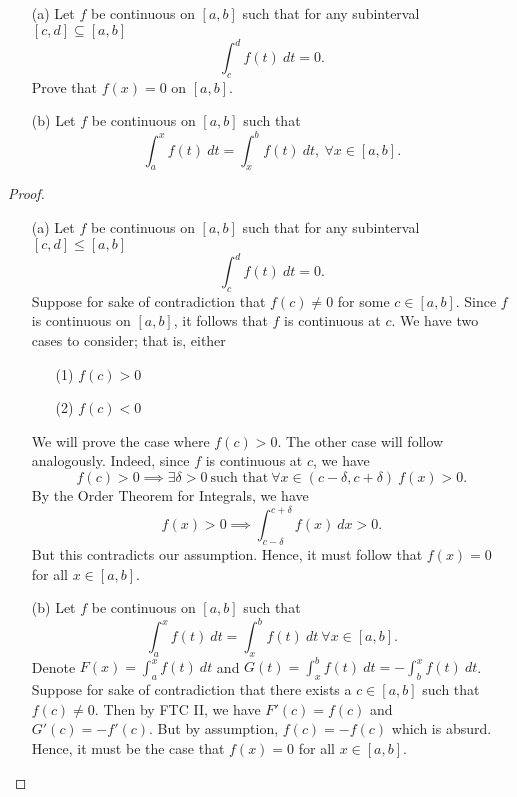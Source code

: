 \documentclass[a4paper]{article}
\begin{document}
\begin{problem}
   \begin{enumerate}
       \item[(a)] Let \( f  \) be continuous on \( [a,b] \) such that for any subinterval \( [c,d] \subseteq  [a,b] \)
           \[  \int_{ c }^{ d } f(t) \ dt = 0.  \]
           Prove that \( f(x) = 0  \) on \( [a,b] \).
       \item[(b)] Let \( f  \) be continuous on \( [a,b] \) such that 
           \[  \int_{ a }^{ x  } f(t) \ dt = \int_{ x }^{ b }  f(t) \ dt, \ \forall x \in [a,b]. \]
   \end{enumerate} 
\end{problem}
\begin{proof}
\begin{enumerate}
    \item[(a)] Let \( f  \) be continuous on \( [a,b] \) such that for any subinterval \( [c,d] \leq [a,b] \) 
        \[  \int_{ c }^{ d } f(t) \ dt = 0.  \]
        Suppose for sake of contradiction that \( f(c) \neq 0   \) for some \( c \in [a,b] \). Since \( f  \) is continuous on \( [a,b] \), it follows that \( f  \) is continuous at \( c  \). We have two cases to consider; that is, either 
        \begin{enumerate}
            \item[(1)] \( f(c) > 0  \) 
            \item[(2)] \( f(c) < 0  \)
        \end{enumerate}
        We will prove the case where \( f(c) > 0 \). The other case will follow analogously. Indeed, since \( f  \) is continuous at \( c  \), we have 
        \[  f(c) > 0 \implies \exists \delta > 0 \ \text{such that} \ \forall x \in (c - \delta, c + \delta) \ f(x) > 0.  \]
        By the Order Theorem for Integrals, we have 
        \[  f(x) > 0 \implies \int_{ c - \delta }^{  c + \delta } f(x) \ dx > 0.  \]
        But this contradicts our assumption. Hence, it must follow that \( f(x) = 0 \) for all \( x \in [a,b] \).
    \item[(b)] Let \( f  \) be continuous on \( [a,b] \) such that 
        \[  \int_{ a }^{ x } f(t) \ dt = \int_{ x }^{ b } f(t) \ dt \ \forall x \in [a,b]. \]
        Denote \( F(x) = \int_{ a }^{ x  }  f(t) \ dt  \) and \( G(t) = \int_{ x }^{ b } f(t) \ dt = -  \int_{ b }^{ x }  f(t) \ dt \). Suppose for sake of contradiction that there exists a \( c \in [a,b] \) such that \( f(c) \neq 0  \). Then by FTC II, we have \( F'(c) = f(c) \) and \( G'(c) = - f'(c) \). But by assumption, \( f(c) = - f(c) \) which is absurd. Hence, it must be the case that \( f(x) = 0  \) for all \( x \in [a,b] \).

\end{enumerate}
\end{proof}
\end{document}

